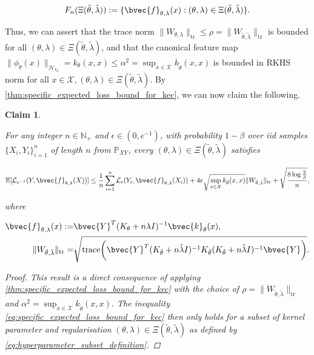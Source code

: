 \documentclass{article}
\newtheorem{claim}[theorem]{Claim}
\begin{document}
		\begin{equation}
			F_{n}(\Xi(\tilde{\theta}, \tilde{\lambda})) := \{\bvec{f}_{\theta, \lambda}(x) : (\theta, \lambda) \in \Xi(\tilde{\theta}, \tilde{\lambda}) \}.
		\end{equation}
		
		Thus, we can assert that the trace norm $\| W_{\theta, \lambda} \|_{\mathrm{tr}} \leq \rho = \| W_{\tilde{\theta}, \tilde{\lambda}} \|_{\mathrm{tr}}$ is bounded for all $(\theta, \lambda) \in \Xi(\tilde{\theta}, \tilde{\lambda})$, and that the canonical feature map $\| \phi_{\theta}(x) \|_{\mathcal{H}_{k_{\theta}}} = k_{\theta}(x, x) \leq \alpha^{2} = \sup_{x \in \mathcal{X}} k_{\tilde{\theta}}(x, x)$ is bounded in RKHS norm for all $x \in \mathcal{X}, (\theta, \lambda) \in \Xi(\tilde{\theta}, \tilde{\lambda})$. By \cref{thm:specific_expected_loss_bound_for_kec}, we can now claim the following.

		\begin{claim}
			\label{thm:general_trace_norm_bound}
			
			For any integer $n \in \mathbb{N}_{+}$ and $\epsilon \in (0, e^{-1})$, with probability $1 - \beta$ over \textit{iid} samples $\{X_{i}, Y_{i}\}_{i = 1}^{n}$ of length $n$ from $\mathbb{P}_{X Y}$, every $(\theta, \lambda) \in \Xi(\tilde{\theta}, \tilde{\lambda})$ satisfies
			
			\begin{equation}
				\mathbb{E}[\mathcal{L}_{e^{-1}}(Y, \bvec{f}_{\theta, \lambda}(X))] \leq \frac{1}{n} \sum_{i = 1}^{n} \mathcal{L}_{\epsilon}(Y_{i}, \bvec{f}_{\theta, \lambda}(X_{i})) + 4 e \sqrt{\sup_{x \in \mathcal{X}} k_{\tilde{\theta}}(x, x)} \| W_{\tilde{\theta}, \tilde{\lambda}} \|_{\mathrm{tr}} + \sqrt{\frac{8 \log{\frac{2}{\beta}}}{n}},
			\label{eq:general_trace_norm_bound}
			\end{equation}
			
			where 
			
			\begin{equation}
				\begin{aligned}
					\bvec{f}_{\theta, \lambda}(x) :=& \bvec{Y}^{T} (K_{\theta} + n \lambda I)^{-1} \bvec{k}_{\theta}(x), \\
					\| W_{\tilde{\theta}, \tilde{\lambda}} \|_{\mathrm{tr}} =& \sqrt{\mathrm{trace}\bigg(\bvec{Y}^{T} (K_{\tilde{\theta}} + n \tilde{\lambda} I)^{-1} K_{\tilde{\theta}} (K_{\tilde{\theta}} + n \tilde{\lambda} I)^{-1} \bvec{Y}\bigg)}.
				\end{aligned}
			\end{equation}
			
			\begin{proof}
				This result is a direct consequence of applying \cref{thm:specific_expected_loss_bound_for_kec} with the choice of $\rho = \| W_{\tilde{\theta}, \tilde{\lambda}} \|_{\mathrm{tr}}$ and $\alpha^{2} = \sup_{x \in \mathcal{X}} k_{\tilde{\theta}}(x, x)$. The inequality \eqref{eq:specific_expected_loss_bound_for_kec} then only holds for a subset of kernel parameter and regularisation $(\theta, \lambda) \in \Xi(\tilde{\theta}, \tilde{\lambda})$ as defined by \eqref{eq:hyperparameter_subset_definition}.
			\end{proof}
		\end{claim}
		
\end{document}
